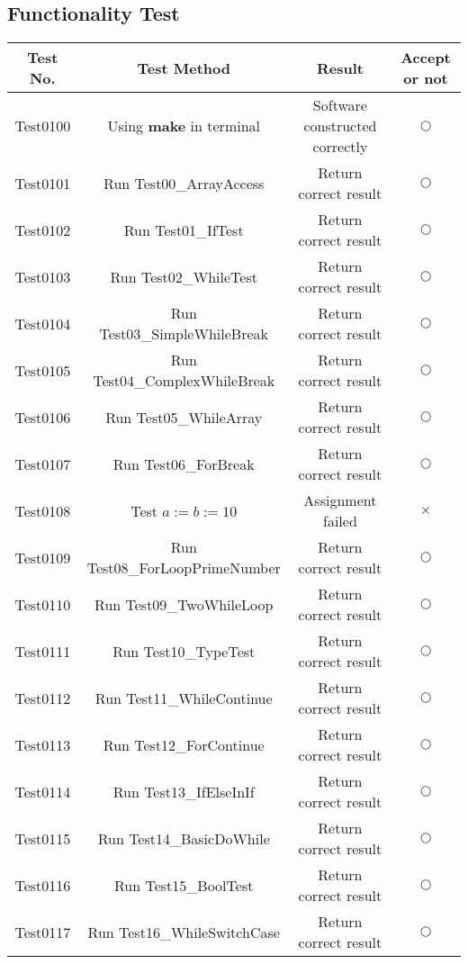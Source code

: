 \documentclass{article}
\begin{document}
	\subsection{Functionality Test}
	\begin{center}
			\begin{tabular}{cccc}
			\toprule
			Test No. & Test Method & Result & Accept or not \\
			\midrule
			Test0100 & Using \textbf{make} in terminal & Software constructed correctly & $ \bigcirc $ \\
			Test0101 & Run Test00\_ArrayAccess & Return correct result & $ \bigcirc $ \\
			Test0102 & Run Test01\_IfTest & Return correct result & $ \bigcirc $ \\
			Test0103 & Run Test02\_WhileTest & Return correct result & $ \bigcirc $ \\
			Test0104 & Run Test03\_SimpleWhileBreak & Return correct result & $ \bigcirc $ \\
			Test0105 & Run Test04\_ComplexWhileBreak & Return correct result & $ \bigcirc $ \\
			Test0106 & Run Test05\_WhileArray & Return correct result & $ \bigcirc $ \\
			Test0107 & Run Test06\_ForBreak & Return correct result & $ \bigcirc $ \\
			Test0108 & Test $ a:=b:=10 $ & Assignment failed & $ \times $ \\
			Test0109 & Run Test08\_ForLoopPrimeNumber & Return correct result & $ \bigcirc $ \\
			Test0110 & Run Test09\_TwoWhileLoop & Return correct result & $ \bigcirc $ \\
			Test0111 & Run Test10\_TypeTest & Return correct result & $ \bigcirc $ \\
			Test0112 & Run Test11\_WhileContinue & Return correct result & $ \bigcirc $ \\
			Test0113 & Run Test12\_ForContinue & Return correct result & $ \bigcirc $ \\
			Test0114 & Run Test13\_IfElseInIf & Return correct result & $ \bigcirc $ \\
			Test0115 & Run Test14\_BasicDoWhile & Return correct result & $ \bigcirc $ \\
			Test0116 & Run Test15\_BoolTest & Return correct result & $ \bigcirc $ \\
			Test0117 & Run Test16\_WhileSwitchCase & Return correct result & $ \bigcirc $ \\

\end{tabular}
\end{center}
\end{document}
